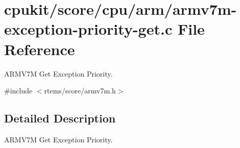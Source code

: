 \hypertarget{armv7m-exception-priority-get_8c}{}\section{cpukit/score/cpu/arm/armv7m-\/exception-\/priority-\/get.c File Reference}
\label{armv7m-exception-priority-get_8c}


A\+R\+M\+V7M Get Exception Priority.  


{\ttfamily \#include $<$rtems/score/armv7m.\+h$>$}\newline


\subsection{Detailed Description}
A\+R\+M\+V7M Get Exception Priority. 

